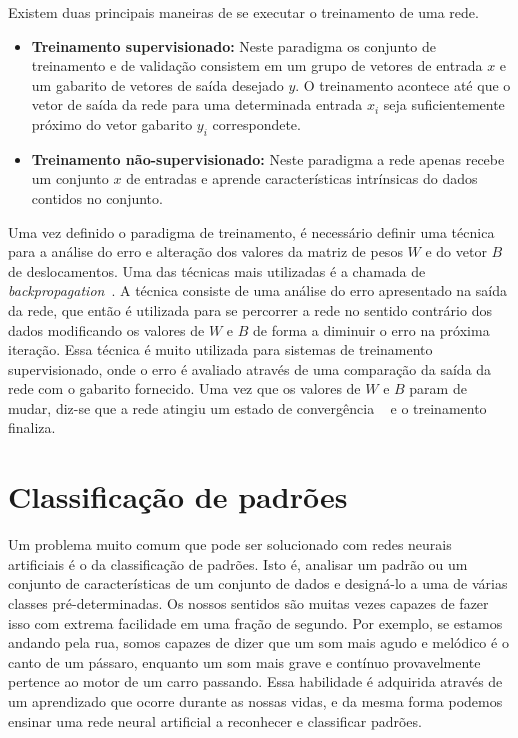 Existem duas principais maneiras de se executar o treinamento de uma rede.

\begin{itemize}
	\item \textbf{Treinamento supervisionado:} Neste paradigma os conjunto de treinamento e de validação consistem em um grupo de vetores de entrada $x$ e um gabarito de vetores de saída desejado $y$. O treinamento acontece até que o vetor de saída da rede para uma determinada entrada $x_i$ seja suficientemente próximo do vetor gabarito $y_i$ correspondete.
	
	
	\item \textbf{Treinamento não-supervisionado:} Neste paradigma a rede apenas recebe um conjunto $x$ de entradas e aprende características intrínsicas do dados contidos no conjunto.
	
\end{itemize}

Uma vez definido o paradigma de treinamento, é necessário definir uma técnica para a análise do erro e alteração dos valores da matriz de pesos $W$ e do vetor $B$ de deslocamentos. Uma das técnicas mais utilizadas é a chamada de \textit{backpropagation}~\cite{DeepLearning, ZhangNNSurvey}. A técnica consiste de uma análise do erro apresentado na saída da rede, que então é utilizada para se percorrer a rede no sentido contrário dos dados modificando os valores de $W$ e $B$ de forma a diminuir o erro na próxima iteração. Essa técnica é muito utilizada para sistemas de treinamento supervisionado, onde o erro é avaliado através de uma comparação da saída da rede com o gabarito fornecido. Uma vez que os valores de $W$ e $B$ param de mudar, diz-se que a rede atingiu um estado de convergência ~\cite{Kosabov} e o treinamento finaliza.


\section{Classificação de padrões}




Um problema muito comum que pode ser solucionado com redes neurais artificiais é o da classificação de padrões. Isto é, analisar um padrão ou um conjunto de características de um conjunto de dados e designá-lo a uma de várias classes pré-determinadas. Os nossos sentidos são muitas vezes capazes de fazer isso com extrema facilidade em uma fração de segundo. Por exemplo, se estamos andando pela rua, somos capazes de dizer que um som mais agudo e melódico é o canto de um pássaro, enquanto um som mais grave e contínuo provavelmente pertence ao motor de um carro passando. Essa habilidade é adquirida através de um aprendizado que ocorre durante as nossas vidas, e da mesma forma podemos ensinar uma rede neural artificial a reconhecer e classificar padrões.

